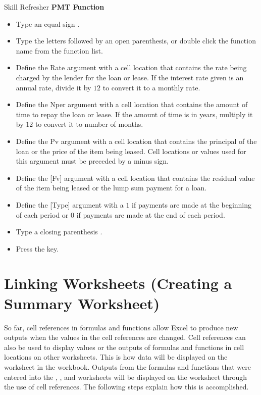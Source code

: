 \begin{center}
	\begin{sklbox}{Skill Refresher}
		\textbf{PMT Function}
		\\
		\begin{itemize}
			\setlength{\itemsep}{0pt}
			\setlength{\parskip}{0pt}
			\setlength{\parsep}{0pt}
			
			\item Type an equal sign \fmtTyping{=}.
			\item Type the letters  followed by an open parenthesis, or double click the function name from the function list.
			\item Define the Rate argument with a cell location that contains the rate being charged by the lender for the loan or lease. If the interest rate given is an annual rate, divide it by $ 12 $ to convert it to a monthly rate.
			\item Define the Nper argument with a cell location that contains the amount of time to repay the loan or lease. If the amount of time is in years, multiply it by $ 12 $ to convert it to number of months.
			\item Define the Pv argument with a cell location that contains the principal of the loan or the price of the item being leased. Cell locations or values used for this argument must be preceded by a minus sign.
			\item Define the [Fv] argument with a cell location that contains the residual value of the item being leased or the lump sum payment for a loan.
			\item Define the [Type] argument with a $ 1 $ if payments are made at the beginning of each period or $ 0 $ if payments are made at the end of each period.
			\item Type a closing parenthesis \fmtTyping{)}.
			\item Press the  key.
			
		\end{itemize}
	\end{sklbox}
\end{center}

\section{Linking Worksheets (Creating a Summary Worksheet)}

So far, cell references in formulas and functions allow Excel to produce new outputs when the values in the cell references are changed. Cell references can also be used to display values or the outputs of formulas and functions in cell locations on other worksheets. This is how data will be displayed on the  worksheet in the  workbook. Outputs from the formulas and functions that were entered into the , , and  worksheets will be displayed on the  worksheet through the use of cell references. The following steps explain how this is accomplished.

